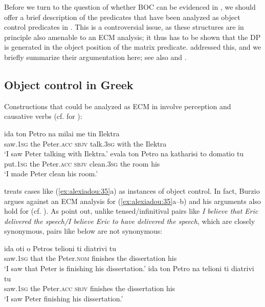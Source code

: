 \documentclass[output=paper]{langsci/langscibook}
\begin{document}
Before we turn to the question of whether BOC can be evidenced in , we should offer a brief description of the predicates that have been analyzed as object control predicates in . This is a controversial issue, as these structures are in principle also amenable to an ECM analysis; it thus has to be shown that the DP is generated in the object position of the matrix predicate. \citet{Alexiadou1997} addressed this, and we briefly summarize their argumentation here; see also \citet{Kotzoglou2002} and \citet{Kotzoglou2007}. 

\subsection{Object control in Greek}%
Constructions that could be analyzed as ECM in  involve perception and causative verbs (cf. \citealt{Burzio1986} for ):


\ea%
    \label{ex:alexiadou:35}
    \ea \gll ida          ton  Petro         na    milai     me   tin Ilektra\\
             saw{}.\textsc{1sg}  the   Peter{}.\textsc{acc}  \textsc{sbjv} talk.\textsc{3sg} with  the Ilektra\\
    \glt     ‘I saw Peter talking with Ilektra.’
    \ex
    \gll evala      ton Petro       na     katharisi   to   domatio tu\\ 
             put{}.\textsc{1sg}  the Peter{}.\textsc{acc} \textsc{sbjv}   clean.\textsc{3sg}  the  room     his\\
    \glt     ‘I made Peter clean his room.’
    \z
\z    

\citet{Iatridou1993} treats cases like (\ref{ex:alexiadou:35}a) as instances of object control. In fact, Burzio argues against an ECM analysis for (\ref{ex:alexiadou:35}a--b) and his arguments also hold for  (cf. \citealt[287--290]{Burzio1986}). As \citet{Alexiadou1997} point out, unlike tensed\slash infinitival pairs like \textit{I believe that Eric delivered the speech\slash I believe Eric to have delivered the speech}, which are closely synonymous, pairs like  below are not synonymous:

\ea%
    \label{ex:alexiadou:36}
    \ea
    \gll ida          oti   o    Petros         telioni   ti      diatrivi       tu\\
             saw{}.\textsc{1sg}  that  the Peter{}.\textsc{nom}   finishes  the  dissertation his\\
    \glt     ‘I saw that Peter is finishing his dissertation.’
    \ex
    \gll ida          ton  Petro      na     telioni   ti    diatrivi        tu\\
             saw{}.\textsc{1sg}  the  Peter{}.\textsc{acc} \textsc{sbjv} finishes the  dissertation his\\
    \glt     ‘I saw Peter finishing his dissertation.’
    \z
\z\largerpage
\end{document}
